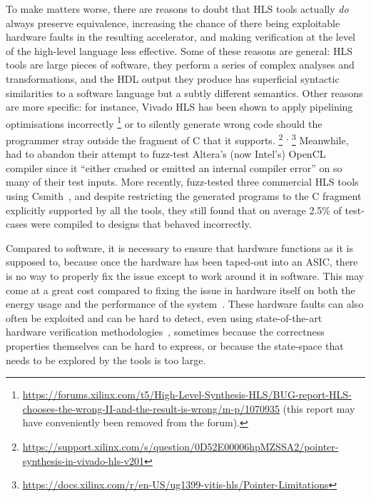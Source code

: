 
To make matters worse, there are reasons to doubt that \gls{HLS} tools actually
\emph{do} always preserve equivalence, increasing the chance of there being
exploitable hardware faults in the resulting accelerator, and making
verification at the level of the high-level language less effective.  Some of
these reasons are general: \gls{HLS} tools are large pieces of software, they
perform a series of complex analyses and transformations, and the \gls{HDL}
output they produce has superficial syntactic similarities to a software
language but a subtly different semantics.  Other reasons are more specific: for
instance, Vivado HLS has been shown to apply pipelining optimisations
incorrectly%
\footnote{\url{https://forums.xilinx.com/t5/High-Level-Synthesis-HLS/BUG-report-HLS-chooses-the-wrong-II-and-the-result-is-wrong/m-p/1070935}
(this report may have conveniently been removed from the forum).}  or to
silently generate wrong code should the programmer stray outside the fragment of
C that it supports.%
\footnote{\url{https://support.xilinx.com/s/question/0D52E00006hpMZSSA2/pointer-synthesis-in-vivado-hls-v201}}%
\textsuperscript{,}%
\footnote{\url{https://docs.xilinx.com/r/en-US/ug1399-vitis-hls/Pointer-Limitations}}
Meanwhile, \textcite{lidbury15_many_core_compil_fuzzin} had to abandon their
attempt to fuzz-test Altera's (now Intel's) OpenCL compiler since it
\enquote{either crashed or emitted an internal compiler error} on so many of
their test inputs.  More recently, \textcite{herklotz21_esrhlst} fuzz-tested
three commercial \gls{HLS} tools using
Csmith~\cite{yang11_findin_under_bugs_c_compil}, and despite restricting the
generated programs to the C fragment explicitly supported by all the tools, they
still found that on average 2.5\% of test-cases were compiled to designs that
behaved incorrectly.

Compared to software, it is necessary to ensure that hardware functions as it is
supposed to, because once the hardware has been taped-out into an \gls{ASIC},
there is no way to properly fix the issue except to work around it in software.
This may come at a great cost compared to fixing the issue in hardware itself on
both the energy usage and the performance of the
system~\cite{herzog21_price_meltd_spect,bowen20_perfor_cost_softw_based_secur_mitig}.
These hardware faults can also often be exploited and can be hard to detect,
even using state-of-the-art hardware verification
methodologies~\cite{dessouky19_hardf}, sometimes because the correctness
properties themselves can be hard to express, or because the state-space that
needs to be explored by the tools is too large.

